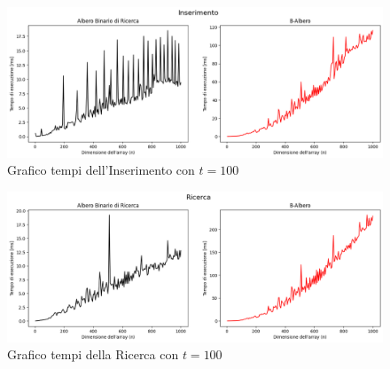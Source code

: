 \begin{figure}[H]
    \centering
    \includegraphics[width=\textwidth]{side-graphs/insert-ms-t100.png}
    \caption{Grafico tempi dell'Inserimento con $t=100$}
        \label{fig:sidegraphinserttimet100}
\end{figure}
    
\begin{figure}[H]
    \centering
    \includegraphics[width=\textwidth]{side-graphs/search-ms-t100.png}
    \caption{Grafico tempi della Ricerca con $t=100$}    \label{fig:sidegraphsearchtimet100}
\end{figure}

